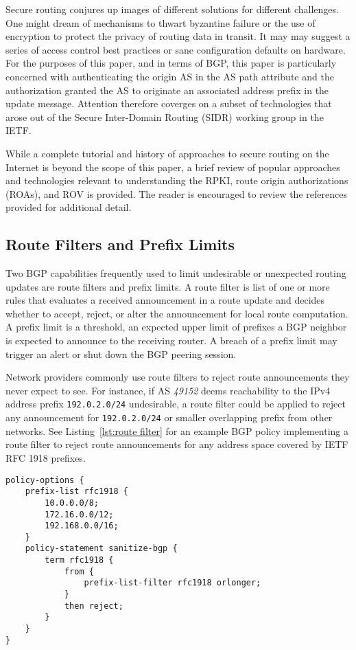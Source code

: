 \documentclass[sigconf]{acmart}
\begin{document}
Secure routing conjures up images of different solutions for different
challenges.  One might dream of mechanisms to thwart byzantine failure
or the use of encryption to protect the privacy of routing data in
transit.  It may may suggest a series of access control best practices
or sane configuration defaults on hardware.  For the purposes of this
paper, and in terms of BGP, this paper is particularly concerned with
authenticating the origin AS in the AS path attribute and the
authorization granted the AS to originate an associated address prefix
in the update message.  Attention therefore coverges on a subset of
technologies that arose out of the Secure Inter-Domain Routing (SIDR)
working group in the IETF.

While a complete tutorial and history of approaches to secure routing on
the Internet is beyond the scope of this paper, a brief review of
popular approaches and technologies relevant to understanding the RPKI,
route origin authorizations (ROAs), and ROV is provided.  The reader is
encouraged to review the references provided for additional detail.

\subsection{Route Filters and Prefix Limits}

Two BGP capabilities frequently used to limit undesirable or unexpected
routing updates are route filters and prefix limits.  A route filter is
list of one or more rules that evaluates a received announcement in a
route update and decides whether to accept, reject, or alter the
announcement for local route computation.  A prefix limit is a
threshold, an expected upper limit of prefixes a BGP neighbor is
expected to announce to the receiving router.  A breach of a prefix
limit may trigger an alert or shut down the BGP peering session.

Network providers commonly use route filters to reject route
announcements they never expect to see.  For instance, if AS
\emph{49152} deems reachability to the IPv4 address prefix
\texttt{192.0.2.0/24} undesirable, a route filter could be applied to
reject any announcement for \texttt{192.0.2.0/24} or smaller overlapping
prefix from other networks.  See Listing~\ref{lst:route filter} for an
example BGP policy implementing a route filter to reject route
announcements for any address space covered by IETF RFC 1918
prefixes.\cite{moskowitz_address_1996}

\begin{lstlisting}[float,basicstyle=\footnotesize\ttfamily,caption={Example Junos route filter},label={lst:route filter}]
policy-options {
    prefix-list rfc1918 {
        10.0.0.0/8;                         
        172.16.0.0/12;                      
        192.168.0.0/16;                     
    }
    policy-statement sanitize-bgp {
        term rfc1918 {
            from {
                prefix-list-filter rfc1918 orlonger;
            }
            then reject;
        }
    }
}
\end{lstlisting}
\end{document}
